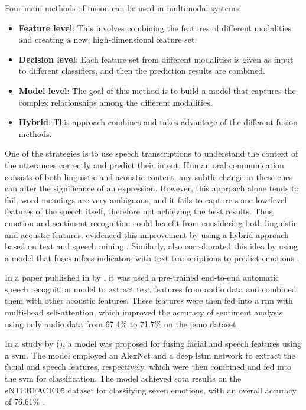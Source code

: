 Four main methods of fusion can be used in multimodal systems:
\begin{itemize}
\item \textbf{Feature level}: This involves combining the features of different modalities and creating a new, high-dimensional feature set.

\item \textbf{Decision level}: Each feature set from different modalities is given as input to different classifiers, and then the prediction results are combined.

\item \textbf{Model level}: The goal of this method is to build a model that captures the complex relationships among the different modalities.

\item \textbf{Hybrid}: This approach combines and takes advantage of the different fusion methods.

\end{itemize}

One of the strategies is to use speech transcriptions to understand the context of the utterances correctly and predict their intent. Human oral communication consists of both linguistic and acoustic content, any subtle change in these cues can alter the significance of an expression. However, this approach alone tends to fail, word meanings are very ambiguous, and it fails to capture some low-level features of the speech itself, therefore not achieving the best results. Thus, emotion and sentiment recognition could benefit from considering both linguistic and acoustic features. \citeauthor{BHASKAR2015635} evidenced this improvement by using a hybrid approach based on text and speech mining \cite{BHASKAR2015635}. Similarly, \citeauthor{ser_strategies} also corroborated this idea by using a model that fuses \ac{mfccs} indicators with text transcriptions to predict emotions \cite{ser_strategies}.

In a paper published in \citeyear{Lu2020} by \citeauthor{Lu2020}, it was used a pre-trained end-to-end automatic speech recognition model to extract text features from audio data and combined them with other acoustic features. These features were then fed into a \ac{rnn} with multi-head self-attention, which improved the accuracy of sentiment analysis using only audio data from 67.4\% to 71.7\% on the \ac{iemo} dataset.

In a study by \citeauthor{Handa2021} (\citeyear{Handa2021}), a model was proposed for fusing facial and speech features using a \ac{svm}. The model employed an AlexNet and a deep \ac{lstm} network to extract the facial and speech features, respectively, which were then combined and fed into the \ac{svm} for classification. The model achieved \ac{sota} results on the eNTERFACE’05 dataset for classifying seven emotions, with an overall accuracy of 76.61\% \cite{Handa2021}.

